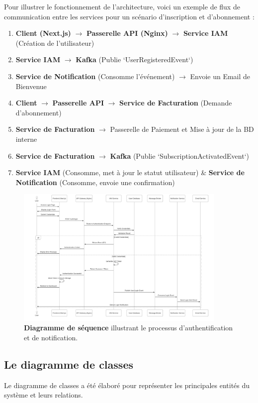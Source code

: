 Pour illustrer le fonctionnement de l'architecture, voici un exemple de flux de communication entre les services pour un scénario d'inscription et d'abonnement :
\begin{enumerate}
  \item \textbf{Client (Next.js)} $\rightarrow$ \textbf{Passerelle API (Nginx)} $\rightarrow$ \textbf{Service IAM} (Création de l'utilisateur)
  \item \textbf{Service IAM} $\rightarrow$ \textbf{Kafka} (Publie `UserRegisteredEvent`)
  \item \textbf{Service de Notification} (Consomme l'événement) $\rightarrow$ Envoie un Email de Bienvenue
  \item \textbf{Client} $\rightarrow$ \textbf{Passerelle API} $\rightarrow$ \textbf{Service de Facturation} (Demande d'abonnement)
  \item \textbf{Service de Facturation} $\rightarrow$ Passerelle de Paiement et Mise à jour de la BD interne
  \item \textbf{Service de Facturation} $\rightarrow$ \textbf{Kafka} (Publie `SubscriptionActivatedEvent`)
  \item \textbf{Service IAM} (Consomme, met à jour le statut utilisateur) \& \textbf{Service de Notification} (Consomme, envoie une confirmation)
\end{enumerate}

\begin{figure}[H]
  \centering
  \includegraphics[width=0.9\textwidth,keepaspectratio]{images/sequence_diagram.png}
  \caption{\textbf{Diagramme de séquence} illustrant le processus d'authentification et de notification.}
  \label{fig:sequence_diagram}
\end{figure}

\subsection{Le diagramme de classes}
Le diagramme de classes a été élaboré pour représenter les principales entités du système et leurs relations.

